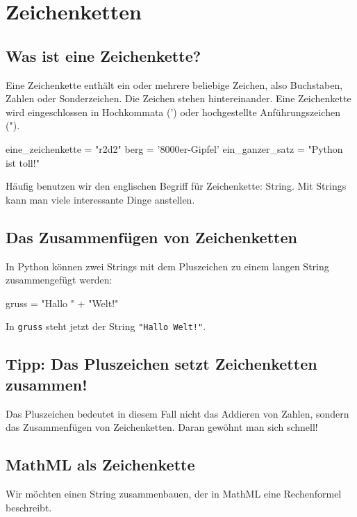 \section{Zeichenketten}

\subsection*{Was ist eine Zeichenkette?}

Eine Zeichenkette enthält ein oder mehrere beliebige Zeichen, also Buchstaben, Zahlen oder Sonderzeichen. Die Zeichen stehen hintereinander. Eine Zeichenkette wird eingeschlossen in Hochkommata (') oder hochgestellte Anführungszeichen (").

\begin{codePython}
eine_zeichenkette = "r2d2"
berg = '8000er-Gipfel'
ein_ganzer_satz = "Python ist toll!"
\end{codePython}

Häufig benutzen wir den englischen Begriff für Zeichenkette: String. Mit Strings kann man viele interessante Dinge anstellen.

\subsection*{Das Zusammenfügen von Zeichenketten}

In Python können zwei Strings mit dem Pluszeichen zu einem langen String zusammengefügt werden:

\begin{codePython}
gruss = "Hallo " + "Welt!"
\end{codePython}

In \texttt{gruss} steht jetzt der String \texttt{"Hallo Welt!"}.

\subsection*{Tipp: Das Pluszeichen setzt Zeichenketten zusammen!}

Das Pluszeichen bedeutet in diesem Fall nicht das Addieren von Zahlen, sondern das Zusammenfügen von Zeichenketten. Daran gewöhnt man sich schnell!

\subsection*{MathML als Zeichenkette}

Wir möchten einen String zusammenbauen, der in MathML eine Rechenformel beschreibt.

